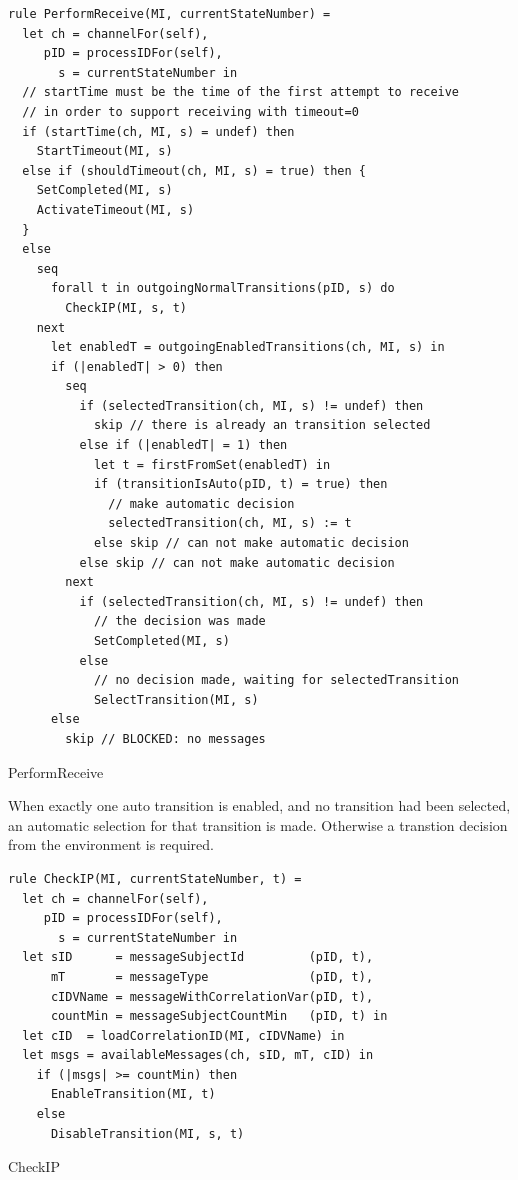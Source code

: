 \begin{listing}[htbp]
\begin{verbatim}
rule PerformReceive(MI, currentStateNumber) =
  let ch = channelFor(self),
     pID = processIDFor(self),
       s = currentStateNumber in
  // startTime must be the time of the first attempt to receive
  // in order to support receiving with timeout=0
  if (startTime(ch, MI, s) = undef) then
    StartTimeout(MI, s)
  else if (shouldTimeout(ch, MI, s) = true) then {
    SetCompleted(MI, s)
    ActivateTimeout(MI, s)
  }
  else
    seq
      forall t in outgoingNormalTransitions(pID, s) do
        CheckIP(MI, s, t)
    next
      let enabledT = outgoingEnabledTransitions(ch, MI, s) in
      if (|enabledT| > 0) then
        seq
          if (selectedTransition(ch, MI, s) != undef) then
            skip // there is already an transition selected
          else if (|enabledT| = 1) then
            let t = firstFromSet(enabledT) in
            if (transitionIsAuto(pID, t) = true) then
              // make automatic decision
              selectedTransition(ch, MI, s) := t
            else skip // can not make automatic decision
          else skip // can not make automatic decision
        next
          if (selectedTransition(ch, MI, s) != undef) then
            // the decision was made
            SetCompleted(MI, s)
          else
            // no decision made, waiting for selectedTransition
            SelectTransition(MI, s)
      else
        skip // BLOCKED: no messages
\end{verbatim}
\caption{PerformReceive}
\label{lst:shortasm:PerformReceive}
\end{listing}




When exactly one auto transition is enabled, and no transition had been selected, an
automatic selection for that transition is made. Otherwise a transtion decision from
the environment is required.




\begin{listing}[htbp]
\begin{verbatim}
rule CheckIP(MI, currentStateNumber, t) =
  let ch = channelFor(self),
     pID = processIDFor(self),
       s = currentStateNumber in
  let sID      = messageSubjectId         (pID, t),
      mT       = messageType              (pID, t),
      cIDVName = messageWithCorrelationVar(pID, t),
      countMin = messageSubjectCountMin   (pID, t) in
  let cID  = loadCorrelationID(MI, cIDVName) in
  let msgs = availableMessages(ch, sID, mT, cID) in
    if (|msgs| >= countMin) then
      EnableTransition(MI, t)
    else
      DisableTransition(MI, s, t)
\end{verbatim}
\caption{CheckIP}
\label{lst:shortasm:CheckIP}
\end{listing}



